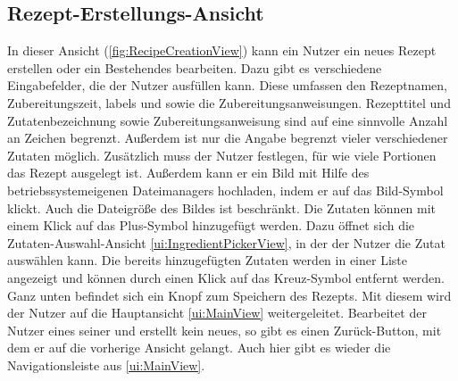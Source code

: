 \documentclass[parskip=full]{scrartcl}
\begin{document}
\subsection{Rezept-Erstellungs-Ansicht}
\label{ui:RecipeCreationView}
In dieser Ansicht (\autoref{fig:RecipeCreationView}) kann ein Nutzer ein neues Rezept erstellen oder ein Bestehendes bearbeiten. Dazu gibt es verschiedene Eingabefelder, die der Nutzer ausfüllen kann. Diese umfassen den Rezeptnamen, Zubereitungszeit, \gls{labels} und  sowie die Zubereitungsanweisungen. Rezepttitel und Zutatenbezeichnung sowie Zubereitungsanweisung sind auf eine sinnvolle Anzahl an Zeichen begrenzt. Außerdem ist nur die Angabe begrenzt vieler verschiedener Zutaten möglich. Zusätzlich muss der Nutzer festlegen, für wie viele Portionen das Rezept ausgelegt ist. Außerdem kann er ein Bild mit Hilfe des betriebssystemeigenen Dateimanagers hochladen, indem er auf das Bild-Symbol klickt. Auch die Dateigröße des Bildes ist beschränkt.
Die Zutaten können mit einem Klick auf das Plus-Symbol hinzugefügt werden. Dazu öffnet sich die Zutaten-Auswahl-Ansicht \ref{ui:IngredientPickerView}, in der der Nutzer die Zutat auswählen kann. Die bereits hinzugefügten Zutaten werden in einer Liste angezeigt und können durch einen Klick auf das Kreuz-Symbol entfernt werden. Ganz unten befindet sich ein Knopf zum Speichern des Rezepts. Mit diesem wird der Nutzer auf die Hauptansicht \ref{ui:MainView} weitergeleitet. Bearbeitet der Nutzer eines seiner  und erstellt kein neues, so gibt es einen Zurück-Button, mit dem er auf die vorherige Ansicht gelangt. Auch hier gibt es wieder die Navigationsleiste aus \ref{ui:MainView}.
\end{document}
